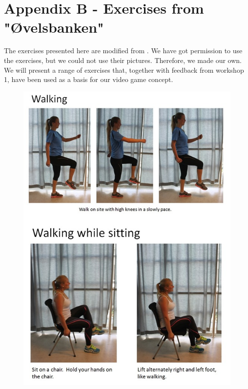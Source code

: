 \newpage
\section*{Appendix B - Exercises from "{Ø}velsbanken"}
\label{app:exercises}

The exercises presented here are modified from \cite{eldretrening}. We have got permission to use the exercises, but we could not use their pictures. Therefore, we made our own. We will present a range of exercises that, together with feedback from workshop 1, have been used as a basis for our video game concept.

\begin{figure} [H]
\centering
\includegraphics[scale=0.7]{Walking.jpg}
\label{app:walking}
\end{figure} 

